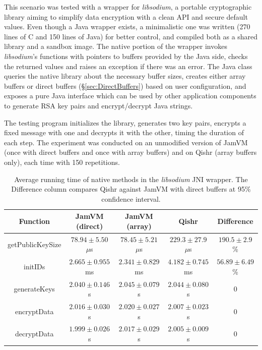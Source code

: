 \documentclass[a4paper,12pt,twoside,openright]{report}
\newcommand{\tool}[1]{\emph{#1}}
\newcommand{\lib}[1]{\tool{lib#1}}
\begin{document}
This scenario was tested with a wrapper for \lib{sodium}, a portable cryptographic library aiming to simplify data encryption with a clean API and secure default values. Even though a Java wrapper exists, a minimalistic one was written (270 lines of C and 150 lines of Java) for better control, and compiled both as a shared library and a sandbox image. The native portion of the wrapper invokes \lib{sodium}'s functions with pointers to buffers provided by the Java side, checks the returned values and raises an exception if there was an error. The Java class queries the native library about the necessary buffer sizes, creates either array buffers or direct buffers (\S\ref{sec:DirectBuffers}) based on user configuration, and exposes a pure Java interface which can be used by other application components to generate RSA key pairs and encrypt/decrypt Java strings. 

The testing program initializes the library, generates two key pairs, encrypts a fixed message with one and decrypts it with the other, timing the duration of each step. The experiment was conducted on an unmodified version of JamVM (once with direct buffers and once with array buffers) and on Qishr (array buffers only), each time with 150 repetitions.

\begin{table}[t]
	\centering
	\scriptsize
	\begin{tabular}{|c|c|c|c|c|}
		\hline
		\bf Function		& \bf JamVM (direct) & \bf JamVM (array) & \bf Qishr	& \bf Difference \\
		\hline
		getPublicKeySize	& $78.94 \pm 5.50$ $\mu$s	& $78.45 \pm 5.21$ $\mu$s	& $229.3 \pm 27.9$ $\mu$s & $190.5 \pm 2.9$ \% \\
		initIDs			& $2.665 \pm 0.955$ ms		& $2.341 \pm 0.829$ ms		& $4.182 \pm 0.745$ ms & $56.89 \pm 6.49$ \% \\
		generateKeys		& $2.040 \pm 0.146$ s		& $2.045 \pm 0.079$ s		& $2.044 \pm 0.080$ s & 0 \\
		encryptData		& $2.016 \pm 0.030$ s		& $2.020 \pm 0.027$ s		& $2.007 \pm 0.023$ s & 0 \\
		decryptData		& $1.999 \pm 0.026$ s 		& $2.017 \pm 0.029$ s 		& $2.005 \pm 0.009$ s & 0 \\
		\hline
	\end{tabular}
	\caption{Average running time of native methods in the \lib{sodium} JNI wrapper. The Difference column compares Qishr against JamVM with direct buffers at 95\% confidence interval.}
	\label{table:OverheadSodium}
\end{table}
\end{document}

